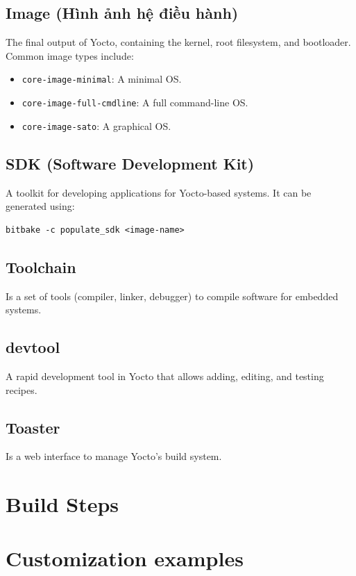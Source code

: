 \documentclass{article}
\begin{document}
\subsection{Image (Hình ảnh hệ điều hành)}
The final output of Yocto, containing the kernel, root filesystem, and bootloader. Common image types include:
\begin{itemize}
    \item \texttt{core-image-minimal}: A minimal OS.
    \item \texttt{core-image-full-cmdline}: A full command-line OS.
    \item \texttt{core-image-sato}: A graphical OS.
\end{itemize}

\subsection{SDK (Software Development Kit)}
A toolkit for developing applications for Yocto-based systems. It can be generated using:
\begin{verbatim}
bitbake -c populate_sdk <image-name>
\end{verbatim}

\subsection{Toolchain}
Is a set of tools (compiler, linker, debugger) to compile software for embedded systems.

\subsection{devtool}
A rapid development tool in Yocto that allows adding, editing, and testing recipes.

\subsection{Toaster}
Is a web interface to manage Yocto's build system.

\section{Build Steps} \label{sec:build-steps}

\section{Customization examples} \label{sec:customization-examples}
\end{document}
